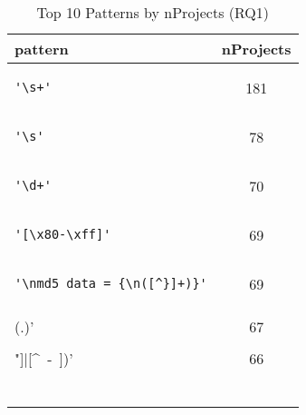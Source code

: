\begin{table}
\begin{center}
\caption{Top 10 Patterns by nProjects (RQ1)}
\label{table:topNW}
\begin{tabular}{lc}
\toprule
pattern & nProjects \\ 
\midrule
\begin{minipage}{2.4in}
\begin{verbatim}
'\s+'\end{verbatim}
\end{minipage}
& 181 \\ 
\midrule
\begin{minipage}{2.4in}
\begin{verbatim}
'\s'\end{verbatim}
\end{minipage}
& 78 \\ 
\midrule
\begin{minipage}{2.4in}
\begin{verbatim}
'\d+'\end{verbatim}
\end{minipage}
& 70 \\ 
\midrule
\begin{minipage}{2.4in}
\begin{verbatim}
'[\x80-\xff]'\end{verbatim}
\end{minipage}
& 69 \\ 
\midrule
\begin{minipage}{2.4in}
\begin{verbatim}
'\nmd5_data = {\n([^}]+)}'\end{verbatim}
\end{minipage}
& 69 \\ 
\midrule
\begin{minipage}{2.4in}
\begin{verbatim}
'\\(.)'\end{verbatim}
\end{minipage}
& 67 \\ 
\midrule
\begin{minipage}{2.4in}
\begin{verbatim}
'([\\"]|[^\ -~])'\end{verbatim}
\end{minipage}
& 66 \\ 
\midrule
\begin{minipage}{2.4in}
\begin{verbatim}

\end{verbatim}
\end{minipage}
\end{tabular}
\end{center}
\end{table}
